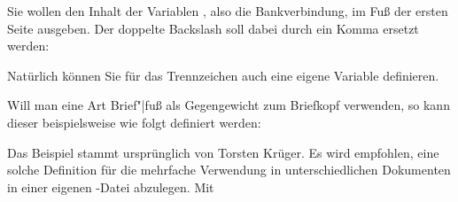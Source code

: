 %
\begin{Example}
  Sie wollen den Inhalt der Variablen ,
  also die Bankverbindung, im Fuß der ersten Seite ausgeben. Der doppelte
  Backslash soll dabei durch ein Komma ersetzt werden:
\begin{lstcode}
\end{lstcode}
  Natürlich können Sie für das Trennzeichen auch eine eigene Variable
  definieren.%
  \iffalse %
  Ich überlasse dem Leser dies als Übung.%
  \fi%
  
  Will man eine Art Brief"|fuß als Gegengewicht zum Briefkopf verwenden, so
  kann dieser beispielsweise wie folgt definiert werden:
\begin{lstcode}
\end{lstcode}
  Das Beispiel stammt ursprünglich von Torsten Krüger. Es wird empfohlen, eine
  solche Definition für die mehrfache Verwendung in unterschiedlichen
  Dokumenten in einer eigenen
  -Datei abzulegen. Mit
\begin{lstcode}
\end{lstcode}
\end{Example}
